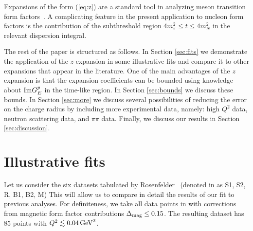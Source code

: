 \documentclass[12pt]{article}
\begin{document}
Expansions of the form (\ref{eq:z}) are a standard tool in analyzing 
meson transition form factors~\cite{Hill:2006ub, Bourrely:1980gp,
Boyd:1994tt,Boyd:1995sq,Lellouch:1995yv,Caprini:1997mu,Arnesen:2005ez,
Becher:2005bg,Hill:2006bq,Bourrely:2008za,Bharucha:2010im}.  
A complicating feature in the present application to nucleon form factors 
is the contribution of the subthreshold region $4m_\pi^2 \le t \le 4m_N^2$ in the relevant
dispersion integral.    

The rest of the paper is structured as follows. In Section
\ref{sec:fits} we demonstrate the application of the $z$ expansion in
some illustrative fits and compare it to other expansions that
appear in the literature. One of the main advantages of the $z$
expansion is that the expansion coefficients can be bounded using 
knowledge about ${\rm Im}G_E^p$ in the time-like region. In Section
\ref{sec:bounds} we discuss these bounds. In Section \ref{sec:more} we
discuss several possibilities of reducing the error on the charge
radius by including more experimental data, namely: high $Q^2$ data,
neutron scattering data, and $\pi\pi$ data. Finally, we discuss our
results in Section \ref{sec:discussion}.

\section{Illustrative fits \label{sec:fits}} 

Let us consider the six datasets tabulated by Rosenfelder~\cite{Rosenfelder:1999cd} 
(denoted in \cite{Rosenfelder:1999cd} as S1, S2, R, B1, B2, M)
This will allow us to compare in detail the
results of our fit to previous analyses.   For definiteness, we take all data 
points in \cite{Rosenfelder:1999cd} 
with corrections from magnetic form factor contributions $\Delta_{\rm mag}\le 0.15$. 
The resulting dataset has 85 points with $Q^2 \lesssim 0.04\,{\rm GeV}^2$. 
\end{document}
